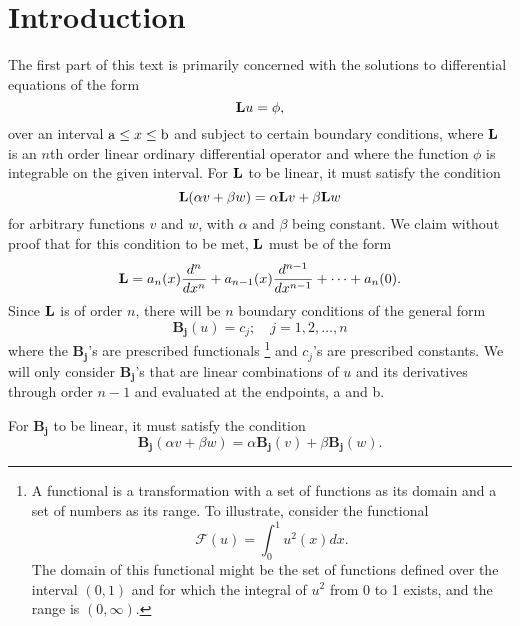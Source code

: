 \section{Introduction}
The first part of this text is primarily concerned with the solutions to differential equations of the form
\begin{equation}
    \mathrm{\bf{L}} u=\phi,
\end{equation}
over an interval \(\mathrm{a} \leq x \leq \mathrm{b}\) and subject to certain boundary conditions, where \(\mathrm{\bf{L}}\) is an \(n\)th order linear ordinary differential operator and where the function \(\phi\) is integrable on the given interval. For \(\mathrm{\bf{L}}\) to be linear, it must satisfy the condition
\begin{equation}
	\mathrm{\bf{L}}(\alpha v + \beta w) = \alpha \mathrm{\bf{L}} v + \beta \mathrm{\bf{L}} w
\end{equation}
for arbitrary functions \(v\) and \(w\), with \(\alpha\) and \(\beta\) being constant. We claim without proof that for this condition to be met, \(\mathrm{\bf{L}}\) must be of the form
\begin{equation} 
	\mathrm{\bf{L}} = a_n(x) \frac{d^n}{dx^n} + a_{n-1}(x) \frac{d^{n-1}}{dx^{n-1}} + \cdots + a_n(0).
\end{equation}
	Since \(\mathrm{\bf{L}}\) is of order \(n\), there will be \(n\) boundary conditions of the general form 
\begin{equation}
	\mathbf{B_j} (u) = c_j;\quad j=1,2,\dots,n
\end{equation}
where the \(\mathbf{B_j}\)'s are prescribed functionals \footnote{A functional is a transformation with a set of functions as its domain and a set of numbers as its range. To illustrate, consider the functional 
\begin{equation}
	\mathcal{F}(u) = \int_{0}^{1} u^2(x)dx.
\end{equation}
The domain of this functional might be the set of functions defined over the interval \((0,1)\) and for which the integral of \(u^2\) from 0 to 1 exists, and the range is \((0, \infty)\).
} and \(c_j\)'s are prescribed constants. We will only consider \(\mathbf{B_j}\)'s that are linear combinations of \(u\) and its derivatives through order \(n-1\) and evaluated at the endpoints, a and b. 

For \(\mathbf{B_j}\) to be linear, it must satisfy the condition
\begin{equation}
	\mathbf{B_j}(\alpha v + \beta w) = \alpha \mathbf{B_j} (v) + \beta \mathbf{B_j}(w).
\end{equation}